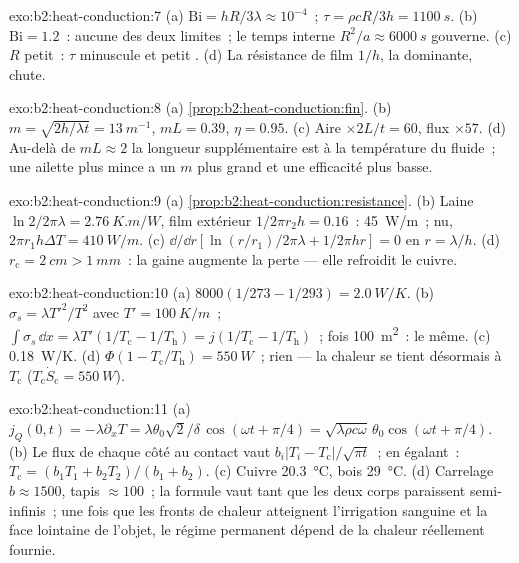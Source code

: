 \begin{solution}{exo:b2:heat-conduction:7}
(a) $\mathrm{Bi} = hR/3\lambda \approx 10^{-4}$~; $\tau = \rho cR/3h = \qty{1100}{s}$.
(b) $\mathrm{Bi} = 1.2$~: aucune des deux limites~; le temps interne $R^2/a \approx
\qty{6000}{s}$ gouverne. (c) $R$ petit~: $\tau$ minuscule et petit .
(d) La résistance de film $1/h$, la dominante, chute.
\end{solution}

\begin{solution}{exo:b2:heat-conduction:8}
(a) \cref{prop:b2:heat-conduction:fin}. (b) $m = \sqrt{2h/\lambda t} =
\qty{13}{m^{-1}}$, $mL = 0.39$, $\eta = 0.95$. (c) Aire $\times 2L/t = 60$, flux
$\times 57$. (d) Au-delà de $mL \approx 2$ la longueur supplémentaire est à la température
du fluide~; une ailette plus mince a un $m$ plus grand et une efficacité plus basse.
\end{solution}

\begin{solution}{exo:b2:heat-conduction:9}
(a) \cref{prop:b2:heat-conduction:resistance}. (b) Laine $\ln 2/2\pi\lambda =
\qty{2.76}{K.m/W}$, film extérieur $1/2\pi r_2h = 0.16$~: \qty{45}{W/m}~; nu,
$2\pi r_1h\Delta T = \qty{410}{W/m}$. (c) $\dd/\dd r[\ln(r/r_1)/2\pi\lambda + 1/2\pi hr]
= 0$ en $r = \lambda/h$. (d) $r_{\text{c}} = \qty{2}{cm} > \qty{1}{mm}$~: la gaine
augmente la perte --- elle refroidit le cuivre.
\end{solution}

\begin{solution}{exo:b2:heat-conduction:10}
(a) $8000(1/273 - 1/293) = \qty{2.0}{W/K}$. (b) $\sigma_s = \lambda T'^2/T^2$ avec
$T' = \qty{100}{K/m}$~; $\int\sigma_s\,\dd x = \lambda T'(1/T_{\text{c}} - 1/T_{\text{h}})
= j(1/T_{\text{c}} - 1/T_{\text{h}})$~; fois \qty{100}{m^2}~: le même. (c)
\qty{0.18}{W/K}. (d) $\Phi(1 - T_{\text{c}}/T_{\text{h}}) = \qty{550}{W}$~; rien
--- la chaleur se tient désormais à $T_{\text{c}}$ ($T_{\text{c}}\dot S_{\text{c}} = \qty{550}{W}$).
\end{solution}

\begin{solution}{exo:b2:heat-conduction:11}
(a) $j_Q(0,t) = -\lambda\partial_xT = \lambda\theta_0\sqrt2/\delta\,\cos(\omega t +
\pi/4) = \sqrt{\lambda\rho c\omega}\,\theta_0\cos(\omega t + \pi/4)$. (b) Le flux de
chaque côté au contact vaut $b_i|T_i - T_{\text{c}}|/\sqrt{\pi t}$~; en égalant~:
$T_{\text{c}} = (b_1T_1 + b_2T_2)/(b_1 + b_2)$. (c) Cuivre \qty{20.3}{\celsius},
bois \qty{29}{\celsius}. (d) Carrelage $b \approx 1500$, tapis $\approx 100$~; la
formule vaut tant que les deux corps paraissent semi-infinis~; une fois que les fronts
de chaleur atteignent l'irrigation sanguine et la face lointaine de l'objet, le régime
permanent dépend de la chaleur réellement fournie.
\end{solution}

